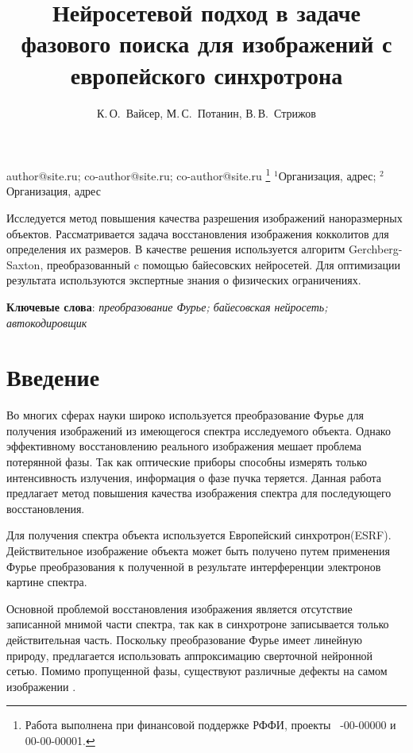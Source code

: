 \documentclass[12pt, twoside]{article}
\begin{document}
\title
    [Шаблон статьи для публикации] %
    {Нейросетевой подход в задаче фазового поиска для изображений с европейского синхротрона}
\author
    { К.\,О.~Вайсер, М.\,С.~Потанин, В.\,В.~Стрижов} %

\email
    {author@site.ru; co-author@site.ru;  co-author@site.ru}
\thanks
    {Работа выполнена при
     финансовой поддержке РФФИ, проекты \No\ -00-00000 и 00-00-00001.}
\organization
    {$^1$Организация, адрес; $^2$Организация, адрес}
\abstract
    {
    	Исследуется метод повышения качества разрешения изображений наноразмерных объектов. Рассматривается задача восстановления изображения кокколитов для определения их размеров. В качестве решения используется алгоритм Gerchberg-Saxton, преобразованный c помощью байесовских нейросетей. Для оптимизации результата используются экспертные знания о физических ограничениях. 
	
	
\bigskip
\noindent
\textbf{Ключевые слова}: \emph {преобразование Фурье; байесовская нейросеть; автокодировщик}
}



\maketitle


\section{Введение}
Во многих сферах науки широко используется преобразование Фурье для получения изображений из имеющегося спектра исследуемого объекта. Однако эффективному восстановлению реального изображения мешает проблема потерянной фазы. Так как оптические приборы способны измерять только интенсивность излучения, информация о фазе пучка теряется. Данная работа предлагает метод повышения качества изображения спектра для последующего восстановления.

Для получения спектра объекта используется Европейский синхротрон(ESRF). Действительное изображение объекта может быть получено путем применения Фурье преобразования к полученной в результате интерференции электронов картине спектра.

Основной проблемой восстановления изображения является отсутствие записанной мнимой части спектра, так как в синхротроне записывается только действительная часть. Поскольку преобразование Фурье имеет линейную природу, предлагается использовать аппроксимацию сверточной нейронной сетью. Помимо пропущенной фазы, существуют различные дефекты на самом изображении \cite{latychevskaia2018iterative}. 
\end{document}
